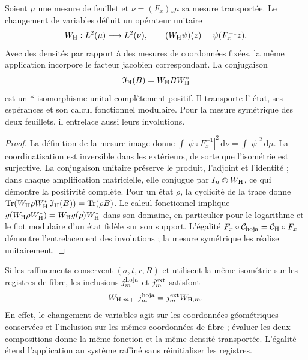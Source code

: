 \begin{proposition}
\label{vii:prop:transporte-unitario-horizonte}
Soient \(\mu\) une mesure de feuillet et \(\nu=(F_x)_*\mu\) sa mesure
transportée. Le changement de variables définit un opérateur unitaire
\begin{equation}
 W_{\rm H}:L^2(\mu)\longrightarrow L^2(\nu),\qquad
 (W_{\rm H}\psi)(z)=\psi(F_x^{-1}z).
 \label{vii:eq:unitaria-horizonte}
\end{equation}
Avec des densités par rapport à des mesures de coordonnées fixées, la même application incorpore le facteur jacobien correspondant. La conjugaison
\begin{equation}
 \mathfrak I_{\rm H}(B)=W_{\rm H}BW_{\rm H}^*
 \label{vii:eq:mapa-observables-horizonte}
\end{equation}
est un \(*\)-isomorphisme unital complètement positif. Il transporte l'
état, ses espérances et son calcul fonctionnel modulaire. Pour la mesure
symétrique des deux feuillets, il entrelace aussi leurs involutions.
\end{proposition}
\begin{proof}
La définition de la mesure image donne \(\int|\psi\circ F_x^{-1}|^2\,\mathrm d\nu
=\int|\psi|^2\,\mathrm d\mu\). La coordinatisation est inversible dans les extérieurs, de sorte que l'isométrie est surjective. La conjugaison unitaire préserve le produit, l'adjoint et l'identité ; dans chaque amplification matricielle, elle conjugue par \(I_n\otimes W_{\rm H}\), ce qui démontre la positivité complète. Pour un état \(\rho\), la cyclicité de la trace donne \(\operatorname{Tr}(W_{\rm H}\rho W_{\rm H}^*
\,\mathfrak I_{\rm H}(B))=\operatorname{Tr}(\rho B)\). Le calcul fonctionnel implique \(g(W_{\rm H}\rho W_{\rm H}^*)=W_{\rm H}g(\rho)W_{\rm H}^*\) dans son domaine, en particulier pour le logarithme et le flot modulaire d'un état fidèle sur son support. L'égalité \(F_x\circ\mathcal C_{\rm hoja}=\mathcal C_{\rm H}\circ F_x\) démontre l'entrelacement des involutions ; la mesure symétrique les réalise unitairement.
\end{proof}

Si les raffinements conservent \((\sigma,t,r,R)\) et utilisent la même
isométrie sur les registres de fibre, les inclusions
\(j_m^{\rm hoja}\) et \(j_m^{\rm ext}\) satisfont
\begin{equation}
 W_{{\rm H},m+1}j_m^{\rm hoja}
 =j_m^{\rm ext}W_{{\rm H},m}.
 \label{vii:eq:naturalidad-horizonte}
\end{equation}
En effet, le changement de variables agit sur les coordonnées géométriques
conservées et l'inclusion sur les mêmes coordonnées de fibre ; évaluer
les deux compositions donne la même fonction et la même densité transportée.
L'égalité étend l'application au système raffiné sans réinitialiser les registres.


